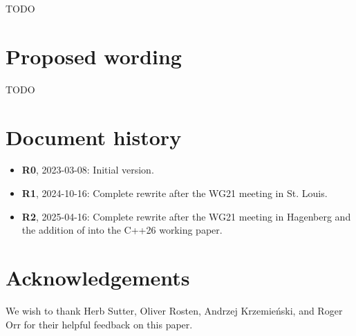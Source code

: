 TODO

\section{Proposed wording}

TODO


\section*{Document history}
\begin{itemize}
\item \textbf{R0}, 2023-03-08: Initial version.
\item \textbf{R1}, 2024-10-16: Complete rewrite after the WG21 meeting in St. Louis.
\item \textbf{R2}, 2025-04-16: Complete rewrite after the WG21 meeting in Hagenberg and the addition of \cite{P2900R14} into the C++26 working paper.
\end{itemize}

\section*{Acknowledgements}

We wish to thank Herb Sutter, Oliver Rosten, Andrzej Krzemie\' nski, and Roger Orr for their helpful feedback on this paper.


\renewcommand{\addcontentsline}[3]{}%







